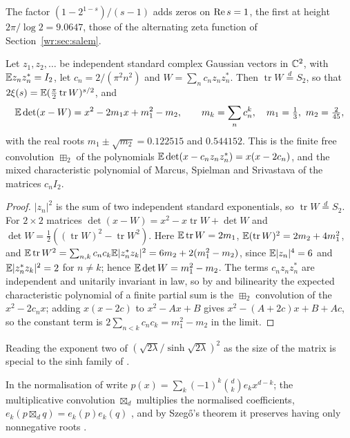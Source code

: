 The factor $(1-2^{1-s})/(s-1)$ adds zeros on $\operatorname{Re} s=1$, the first at height $2\pi/\log2=9.0647$, those of the alternating zeta function of Section~\ref{wr:sec:salem}.

\begin{proposition}\label{prop:wigfree:wishart}
Let $z_1,z_2,\dots$ be independent standard complex Gaussian vectors in $\mathbb{C}^2$, with $\mathbb{E} z_nz_n^*=I_2$, let $c_n=2/(\pi^2n^2)$ and $W=\sum_nc_nz_nz_n^*$. Then $\operatorname{tr}W\stackrel d=S_2$, so that $2\xi(s)=\mathbb{E}(\frac\pi2\operatorname{tr}W)^{s/2}$, and
\[
\mathbb{E}\det(x-W)=x^2-2m_1x+m_1^2-m_2,\qquad m_k=\sum_nc_n^k,\quad m_1=\tfrac13,\ m_2=\tfrac2{45},
\]
with the real roots $m_1\pm\sqrt{m_2}=0.122515$ and $0.544152$. This is the finite free convolution $\boxplus_2$ of the polynomials $\mathbb{E}\det(x-c_nz_nz_n^*)=x(x-2c_n)$, and the mixed characteristic polynomial of Marcus, Spielman and Srivastava \cite{MSS15} of the matrices $c_nI_2$.
\end{proposition}

\begin{proof}
$|z_n|^2$ is the sum of two independent standard exponentials, so $\operatorname{tr}W\stackrel d=S_2$. For $2\times2$ matrices $\det(x-W)=x^2-x\operatorname{tr}W+\det W$ and $\det W=\frac12((\operatorname{tr}W)^2-\operatorname{tr}W^2)$. Here $\mathbb{E}\operatorname{tr}W=2m_1$, $\mathbb{E}(\operatorname{tr}W)^2=2m_2+4m_1^2$, and $\mathbb{E}\operatorname{tr}W^2=\sum_{n,k}c_nc_k\mathbb{E}|z_n^*z_k|^2=6m_2+2(m_1^2-m_2)$, since $\mathbb{E}|z_n|^4=6$ and $\mathbb{E}|z_n^*z_k|^2=2$ for $n\ne k$; hence $\mathbb{E}\det W=m_1^2-m_2$. The terms $c_nz_nz_n^*$ are independent and unitarily invariant in law, so by \cite[Theorem 1.2]{MSS22} and bilinearity the expected characteristic polynomial of a finite partial sum is the $\boxplus_2$ convolution of the $x^2-2c_nx$; adding $x(x-2c)$ to $x^2-Ax+B$ gives $x^2-(A+2c)x+B+Ac$, so the constant term is $2\sum_{n<k}c_nc_k=m_1^2-m_2$ in the limit.
\end{proof}

Reading the exponent two of $(\sqrt{2\lambda}/\sinh\sqrt{2\lambda})^2$ as the size of the matrix is special to the sinh family of \cite{BPY01}.

In the normalisation of \cite{MSS22} write $p(x)=\sum_k(-1)^k\binom dke_kx^{d-k}$; the multiplicative convolution $\boxtimes_d$ multiplies the normalised coefficients, $e_k(p\boxtimes_dq)=e_k(p)e_k(q)$ \cite[Definition 1.4]{MSS22}, and by Szeg\H{o}'s theorem it preserves having only nonnegative roots \cite[Theorem 1.6]{MSS22}.

